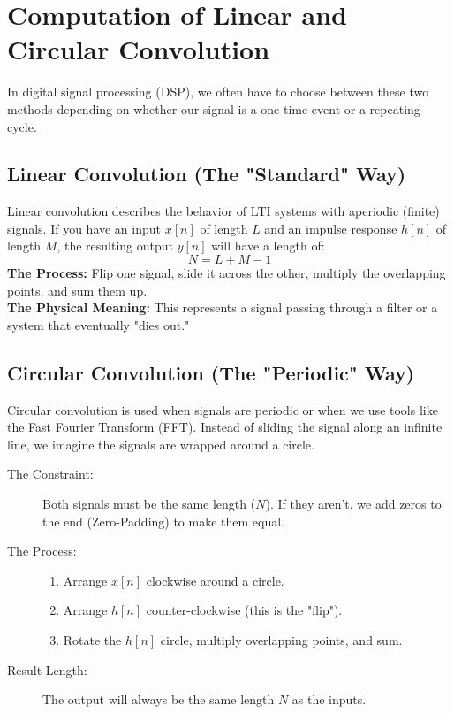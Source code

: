 \documentclass[12pt,a4paper]{article}
\begin{document}
\section*{Computation of Linear and Circular Convolution}
In digital signal processing (DSP), we often have to choose between these two methods depending on whether our signal is a one-time event or a repeating cycle.

\subsection*{Linear Convolution (The "Standard" Way)}
Linear convolution describes the behavior of LTI systems with aperiodic (finite) signals. If you have an input \(x[n]\) of length \(L\) and an impulse response \(h[n]\) of length \(M\), the resulting output \(y[n]\) will have a length of:
\[ N = L + M - 1 \]
\textbf{The Process:} Flip one signal, slide it across the other, multiply the overlapping points, and sum them up. \\
\textbf{The Physical Meaning:} This represents a signal passing through a filter or a system that eventually "dies out."

\subsection*{Circular Convolution (The "Periodic" Way)}
Circular convolution is used when signals are periodic or when we use tools like the Fast Fourier Transform (FFT). Instead of sliding the signal along an infinite line, we imagine the signals are wrapped around a circle.
\begin{description}
    \item[The Constraint:] Both signals must be the same length (\(N\)). If they aren't, we add zeros to the end (Zero-Padding) to make them equal.
    \item[The Process:] 
    \begin{enumerate}
        \item Arrange \(x[n]\) clockwise around a circle.
        \item Arrange \(h[n]\) counter-clockwise (this is the "flip").
        \item Rotate the \(h[n]\) circle, multiply overlapping points, and sum.
    \end{enumerate}
    \item[Result Length:] The output will always be the same length \(N\) as the inputs.
\end{description}
\end{document}
